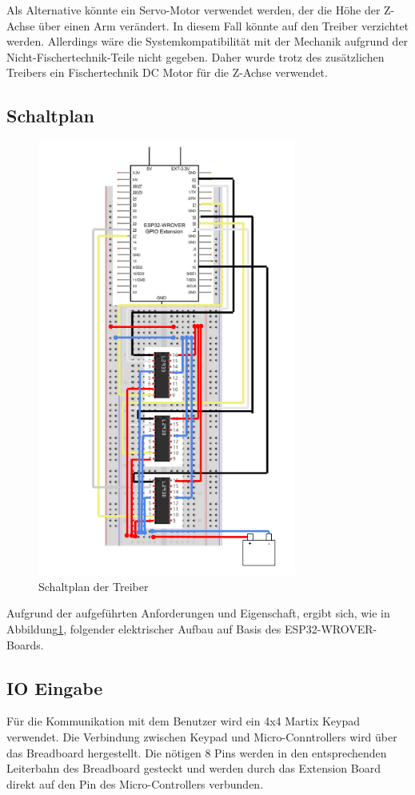 \documentclass[conference,compsoc,final,a4paper]{IEEEtran}
\begin{document}
Als Alternative könnte ein Servo-Motor verwendet werden, der die Höhe der Z-Achse über einen Arm verändert. 
In diesem Fall könnte auf den Treiber verzichtet werden. Allerdings wäre die Systemkompatibilität mit der Mechanik aufgrund der Nicht-Fischertechnik-Teile nicht gegeben. 
Daher wurde trotz des zusätzlichen Treibers ein Fischertechnik DC Motor für die Z-Achse verwendet.

\subsection{Schaltplan}
\begin{figure}[h]
\includegraphics[width=8.5cm]{../images/schaltplan.png}
\caption{Schaltplan der Treiber}\label{Elektrik:Schaltplan}
\end{figure}

Aufgrund der aufgeführten Anforderungen und Eigenschaft, ergibt sich, wie in Abbildung\ref{Elektrik:Schaltplan}, folgender elektrischer Aufbau auf Basis des ESP32-WROVER-Boards.
\subsection{IO Eingabe}

Für die Kommunikation mit dem Benutzer wird ein 4x4 Martix Keypad verwendet. Die Verbindung zwischen Keypad und Micro-Conntrollers wird über das Breadboard hergestellt. 
Die nötigen 8 Pins werden in den entsprechenden Leiterbahn des Breadboard gesteckt und werden durch das Extension Board  direkt auf den Pin des Micro-Controllers verbunden.
\end{document}
